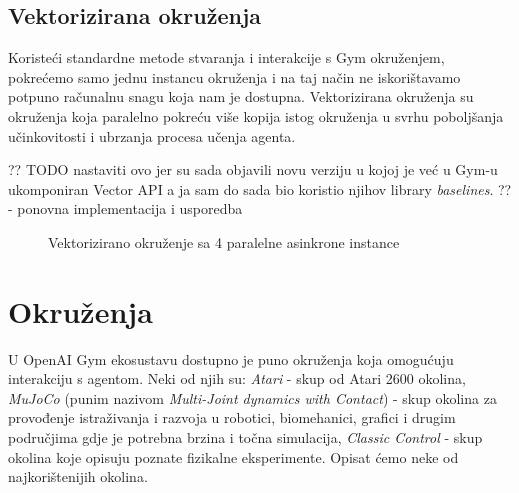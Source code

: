 \subsection{Vektorizirana okruženja}

Koristeći standardne metode stvaranja i interakcije s Gym okruženjem, pokrećemo samo jednu instancu okruženja i na taj način ne iskorištavamo potpuno računalnu snagu koja nam je dostupna. Vektorizirana okruženja  su okruženja koja paralelno pokreću više kopija istog okruženja u svrhu poboljšanja učinkovitosti i ubrzanja procesa učenja agenta.

?? TODO nastaviti ovo jer su sada objavili novu verziju u kojoj je već u Gym-u ukomponiran Vector API a ja sam do sada bio koristio njihov library \textit{baselines}. ?? - ponovna implementacija i usporedba

\begin{figure}[H]
    \centering
    \caption{Vektorizirano okruženje sa 4 paralelne asinkrone instance}
    \label{fig:breakout-vect}
\end{figure}

\section{Okruženja}

U OpenAI Gym ekosustavu dostupno je puno okruženja koja omogućuju interakciju s agentom. Neki od njih su: \textit{Atari} - skup od Atari 2600 okolina, \textit{MuJoCo} (punim nazivom \textit{Multi-Joint dynamics with Contact}) - skup okolina za provođenje istraživanja i razvoja u robotici, biomehanici, grafici i drugim područjima gdje je potrebna brzina i točna simulacija, \textit{Classic Control} - skup okolina koje opisuju poznate fizikalne eksperimente. Opisat ćemo neke od najkorištenijih okolina.

